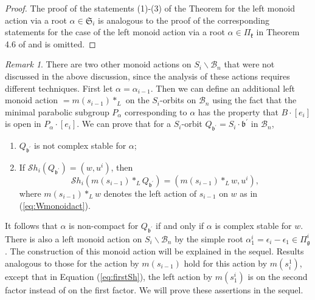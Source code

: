 \documentclass[12pt]{amsart}
\numberwithin{equation}{section}
\theoremstyle{remark}
\newtheorem{rem}[thm]{Remark}
\theoremstyle{definition}
\newcommand{\fk}{\mbox{${\mathfrak k}$}}
\newcommand{\fg}{\mbox{${\mathfrak g}$}}
\newcommand{\fb}{\mbox{${\mathfrak b}$}}
\newcommand{\eps}{\epsilon}
\newcommand{\B}{\mathcal{B}}
\newcommand{\Sh}{\mathcal{S}h}
\begin{document}
\begin{proof}
The proof of the statements (1)-(3) of the Theorem for the left monoid action via a root $\alpha\in\mathfrak{S}_i$ is analogous to the proof of the corresponding statements for the case of the left monoid action via a root $\alpha\in\Pi_{\fk}$ in Theorem 4.6 of \cite{Shpairs} and is omitted.  



\end{proof}




\begin{rem}\label{r:exoticmonoid}
There are two other monoid actions on $S_{i}\backslash\B_{n}$ that were not discussed in the above discussion, since the analysis of these actions requires different techniques.  First let $\alpha=\alpha_{i-1}.$  Then we can define an additional left monoid action $=m(s_{i-1})*_{L}$ on the $S_{i}$-orbits on $\B_{n}$ using the fact that the minimal parabolic subgroup $P_{\alpha}$ corresponding to $\alpha$ has the property that $B\cdot [e_i]$ is open in $P_{\alpha}\cdot [e_i].$   We can prove that for a $S_i$-orbit $Q_{\fb^{\prime}} = S_i \cdot \fb^{\prime}$ in $\B_n$,
\begin{enumerate}
\item $Q_{\fb^{\prime}}$ is not complex stable for $\alpha$;
\item If $\Sh_{i}(Q_{\fb^{\prime}})=(w, u^{i})$, then 
 \begin{equation}\label{eq:firstSh}
 \Sh_{i}(m(s_{i-1})*_{L} Q_{\fb^{\prime}})=(m(s_{i-1})*_{L} w, u^{i}),
 \end{equation}
 where $m(s_{i-1})*_{L}w$ denotes the left action of $s_{i-1}$ on $w$ as in
 (\ref{eq:Wmonoidact}). 
\end{enumerate} It follows that $\alpha$ is non-compact for $Q_{\fb^{\prime}}$ if and only if $\alpha$ is complex stable for $w$.
There is also a left monoid action on $S_{i}\backslash\B_{n}$ by the simple root 
 $\alpha_{1}^{i}=\eps_{i}-\eps_{1}\in\Pi_{\fg}^{i}$.  The construction of this monoid action will be explained in the sequel.  Results analogous to those for the action by $m(s_{i-1})$ hold for this action by $m(s_{i}^{1})$, except that in Equation (\ref{eq:firstSh}), the left action by $m(s_1^{i})$ is on the second factor instead of on the first factor.  We will prove these assertions in the sequel.\end{rem}
 
\end{document}
